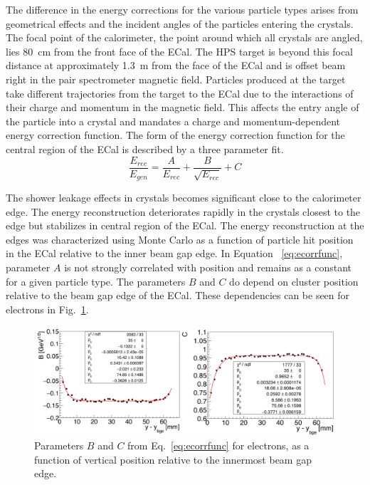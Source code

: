 The difference in the energy corrections for the various particle types arises from geometrical effects and the incident angles of the particles entering the crystals.~\cite{szumila-vance_hps_ecal_2014} The focal point of the calorimeter, the point around which all crystals are angled, lies 80~cm from the front face of the ECal. The HPS target is beyond this focal distance at approximately 1.3~m from the face of the ECal and is offset beam right in the pair spectrometer magnetic field. Particles produced at the target take different trajectories from the target to the ECal due to the interactions of their charge and momentum in the magnetic field. This affects the entry angle of the particle into a crystal and mandates a charge and momentum-dependent energy correction function. The form of the energy correction function for the central region of the ECal is described by a three parameter fit.\\

\begin{equation}
	\label{eq:ecorrfunc}
	\dfrac{E_{rec}}{E_{gen}} = \dfrac{A}{E_{rec}}+\dfrac{B}{\sqrt{E_{rec}}}+C 
\end{equation}

The shower leakage effects in crystals becomes significant close to the calorimeter edge. The energy reconstruction deteriorates rapidly in the crystals closest to the edge but stabilizes in central region of the ECal. The energy reconstruction at the edges was characterized using Monte Carlo as a function of particle hit position in the ECal relative to the inner beam gap edge. In Equation ~\eqref{eq:ecorrfunc}, parameter $A$ is not strongly correlated with position and remains as a constant for a given particle type. The parameters $B$ and $C$  do depend on cluster position relative to the beam gap edge of the ECal. These dependencies can be seen for electrons in Fig.~\ref{Figure:sfparEdge}.

\begin{figure}[htb]
  \centering
      \includegraphics[width=1.0\textwidth]{pics/performance/sfparEdgeFit.png}
  \caption[ECal energy shower parameters for electrons relative to the inside beam gap edge]{Parameters $B$ and $C$ from Eq.~\ref{eq:ecorrfunc} for electrons, as a function of vertical position
relative to the innermost beam gap edge.}
  \label{Figure:sfparEdge}
\end{figure}

